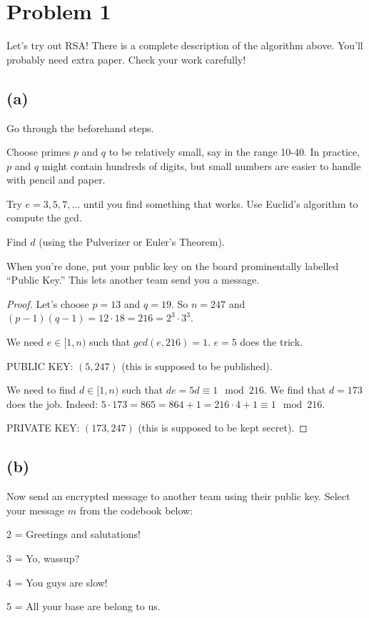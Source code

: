 \documentclass[14pt]{extarticle}
\begin{document}
\section{Problem 1}
Let’s try out RSA! There is a complete description of the algorithm above. You’ll probably need extra paper. Check your work carefully!

\subsection{(a)}
Go through the beforehand steps.

Choose primes $p$ and $q$ to be relatively small, say in the range 10-40. In practice, $p$ and $q$ might contain hundreds of digits, but small numbers are easier to handle with pencil and paper.

Try $e = 3, 5, 7, \ldots$ until you find something that works. Use Euclid’s algorithm to compute the gcd.

Find $d$ (using the Pulverizer or Euler’s Theorem).

When you’re done, put your public key on the board prominentally labelled ``Public Key.'' This lets another team send you a message.
\begin{proof}
Let's choose $p = 13$ and $q = 19$. So $n = 247$ and $(p-1)(q-1) = 12 \cdot 18 = 216 = 2^3 \cdot 3^3$.

We need $e \in[1, n)$ such that $gcd(e, 216) = 1$. $e = 5$ does the trick.

PUBLIC KEY: $(5, 247)$ (this is supposed to be published).

We need to find $d \in [1, n)$ such that $de = 5d \equiv 1 \mod 216$. We find that $d = 173$ does the job. Indeed: $5\cdot 173 = 865 = 864 + 1 = 216 \cdot 4 + 1 \equiv 1 \mod 216$.

PRIVATE KEY: $(173, 247)$ (this is supposed to be kept secret).
\end{proof}

\subsection{(b)}
Now send an encrypted message to another team using their public key. Select your message $m$ from the codebook below:

2 = Greetings and salutations!

3 = Yo, wassup?

4 = You guys are slow!

5 = All your base are belong to us.
\end{document}
